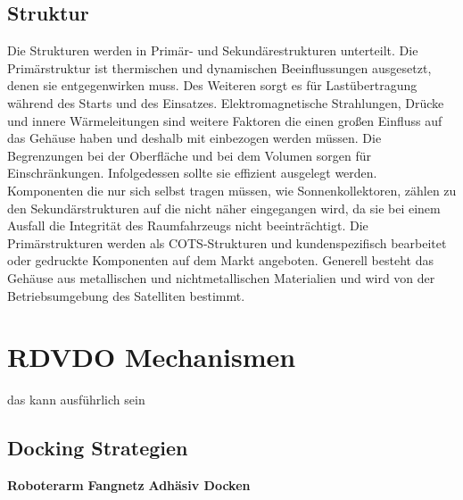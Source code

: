 		\subsection{Struktur}%
		Die Strukturen werden in Primär- und Sekundärestrukturen unterteilt. Die Primärstruktur ist thermischen und dynamischen Beeinflussungen ausgesetzt, denen sie entgegenwirken muss. Des Weiteren sorgt es für Lastübertragung während des Starts und des Einsatzes. Elektromagnetische Strahlungen, Drücke und innere Wärmeleitungen sind weitere Faktoren die einen großen Einfluss auf das Gehäuse haben und deshalb mit einbezogen werden müssen. Die Begrenzungen bei der Oberfläche und bei dem Volumen sorgen für Einschränkungen. Infolgedessen sollte sie effizient ausgelegt werden. Komponenten die nur sich selbst tragen müssen, wie Sonnenkollektoren, zählen zu den Sekundärstrukturen auf die nicht näher eingegangen wird, da sie bei einem Ausfall die Integrität des Raumfahrzeugs nicht beeinträchtigt. Die Primärstrukturen werden als COTS-Strukturen und kundenspezifisch bearbeitet oder gedruckte Komponenten auf dem Markt angeboten. Generell besteht das Gehäuse aus metallischen und nichtmetallischen Materialien und wird von der Betriebsumgebung des Satelliten bestimmt.  \cite[S. 96 - 108]{NASA.Sota.2018}
				
	\section{RDVDO Mechanismen} das kann ausführlich sein
		\subsection{Docking Strategien}
						\textbf{Roboterarm}
						\textbf{Fangnetz}
						\textbf{Adhäsiv Docken}
		\newpage
		
